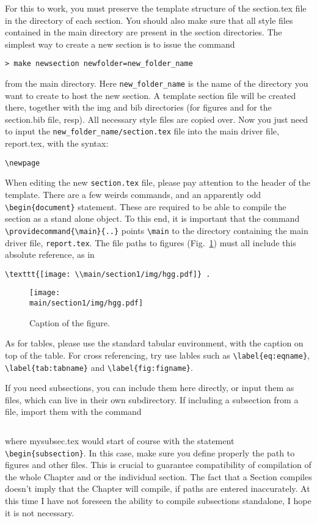 \documentclass[../report.tex]{subfiles}
\providecommand{\main}{..}
\begin{document}
For this to work, you must preserve the template
structure of the section.tex file in the directory of each
section. You should also make sure that all style files contained in
the main directory are present in the section directories. The
simplest way to create a new section is to issue the command
\begin{verbatim}
> make newsection newfolder=new_folder_name
\end{verbatim}
from the main directory. Here \verb|new_folder_name| is the name of the
directory you want to create to host the new section. A template section
file will be created there, together with the img and bib directories
(for figures and for the section.bib file, resp).
All necessary style files are copied over. Now you just need to input
the \verb|new_folder_name/section.tex| file into the main driver file,
report.tex, with the syntax:
\begin{verbatim}
\newpage

\end{verbatim}
When editing the new \texttt{section.tex} file, please pay attention to the
header of the template. There are a few weirds commands, and an
apparently odd
\verb|\begin{document}|
statement. These are required to be able to compile the section as a
stand alone object. To this end, it is important that the command
\verb|\providecommand{\main}{..}|
points \verb|\main| to the directory containing the main driver file,
\texttt{report.tex}. The file paths to figures
(Fig.~\ref{fig:higgs}) must all include this absolute
reference, as in
\begin{verbatim}
\texttt{[image: \\main/section1/img/hgg.pdf]} .
\end{verbatim}

\begin{figure}[ht]
\centering
\texttt{[image: \\main/section1/img/hgg.pdf]}
\caption{Caption of the figure.}
\label{fig:higgs}
\end{figure}

As for tables, please use the standard tabular environment, with the
caption on top of the table. For cross referencing, try use lables
such as
\verb|\label{eq:eqname}|, \verb|\label{tab:tabname}| and
\verb|\label{fig:figname}|. 

If you need subsections, you can include them here directly, or input
them as files, which can live in their own subdirectory. If including
a subsection from a file, import them with the command
\begin{verbatim}

\end{verbatim}
where mysubsec.tex would start of course with the statement
\verb|\begin{subsection}|.  In this case, make sure you define
properly the path to figures and other files. This is crucial to
guarantee compatibility of compilation of the whole Chapter and or the
individual section. The fact that a Section compiles doesn't imply
that the Chapter will compile, if paths are entered inaccurately. At
this time I have not foreseen the ability to compile subsections
standalone, I hope it is not necessary.


\end{document}
